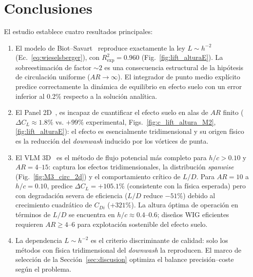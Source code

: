 \documentclass[twocolumn]{article}
\begin{document}
\section{Conclusiones}

El estudio establece cuatro resultados principales:

\begin{enumerate}
  \item El modelo de Biot--Savart~\cite{wieselsberger1922} reproduce
    exactamente la ley $L \sim h^{-2}$ (Ec.~\eqref{eq:wieselsberger}),
    con $R^2_\text{exp} = 0.960$ (Fig.~\ref{fig:lift_alturaE}).
    La sobreestimación de factor ${\sim}2$ es una consecuencia
    estructural de la hipótesis de circulación uniforme
    ($\mathit{AR} \to \infty$). El integrador de punto medio explícito
    predice correctamente la dinámica de equilibrio en efecto suelo
    con un error inferior al 0.2\% respecto a la solución analítica.
  \item El Panel 2D~\cite{hess1967}, es incapaz de cuantificar el efecto
    suelo en alas de $\mathit{AR}$ finito ($\Delta C_L \approx 1.8\%$
    vs. $+99\%$ experimental, Figs.~\ref{fig:c_lift_altura_M2},
    \ref{fig:lift_alturaE}): el efecto es esencialmente tridimensional
    y su origen físico es la reducción del \textit{downwash} inducido
    por los vórtices de punta.
 \item El VLM 3D~\cite{katz2001} es el método de flujo potencial más
    completo para $h/c > 0.10$ y $\mathit{AR} = 4$--$15$: captura
    los efectos tridimensionales, la distribución \textit{spanwise} 
    (Fig.~\ref{fig:M3_circ_2d}) y el comportamiento crítico de $L/D$. 
    Para $\mathit{AR} = 10$ a $h/c = 0.10$, predice $\Delta C_L = +105.1\%$ 
    (consistente con la física esperada) pero con degradación severa de 
    eficiencia ($L/D$ reduce $-51\%$) debido al crecimiento cuadrático de 
    $C_{Di}$ ($+321\%$). La altura óptima de operación en términos de $L/D$ 
    se encuentra en $h/c \approx 0.4$--$0.6$; diseños WIG eficientes 
    requieren $\mathit{AR} \geq 4$--$6$ para explotación sostenible del 
    efecto suelo.
  \item La dependencia $L \sim h^{-2}$ es el criterio discriminante
    de calidad: solo los métodos con física tridimensional del
    \textit{downwash} la reproducen. El marco de selección de la
    Sección~\ref{sec:discusion} optimiza el balance
    precisión--coste según el problema.
\end{enumerate}

\printbibliography
\end{document}
